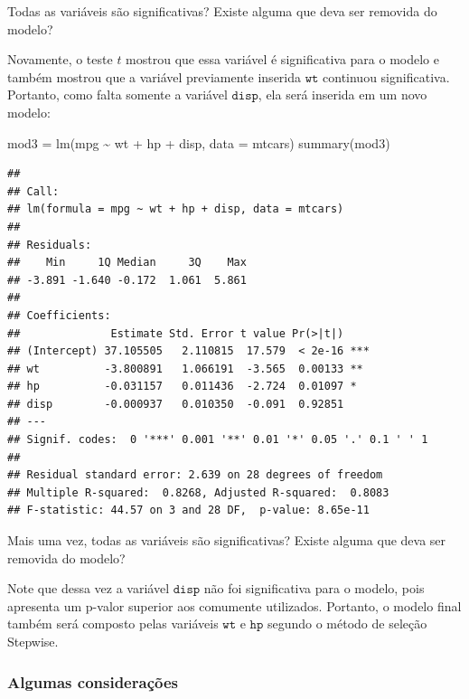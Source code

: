 \documentclass[
]{book}
\newenvironment{Shaded}{\begin{snugshade}}{\end{snugshade}}
\newcommand{\AttributeTok}[1]{\textcolor[rgb]{0.77,0.63,0.00}{#1}}
\newcommand{\FunctionTok}[1]{\textcolor[rgb]{0.00,0.00,0.00}{#1}}
\newcommand{\NormalTok}[1]{#1}
\newcommand{\OtherTok}[1]{\textcolor[rgb]{0.56,0.35,0.01}{#1}}
\newcommand{\SpecialCharTok}[1]{\textcolor[rgb]{0.00,0.00,0.00}{#1}}
\begin{document}
Todas as variáveis são significativas? Existe alguma que deva ser removida do modelo?

Novamente, o teste \(t\) mostrou que essa variável é significativa para o modelo e também mostrou que a variável previamente inserida \(\texttt{wt}\) continuou significativa. Portanto, como falta somente a variável \(\texttt{disp}\), ela será inserida em um novo modelo:

\begin{Shaded}
\begin{Highlighting}[]
\NormalTok{mod3 }\OtherTok{=} \FunctionTok{lm}\NormalTok{(mpg }\SpecialCharTok{\textasciitilde{}}\NormalTok{ wt }\SpecialCharTok{+}\NormalTok{ hp }\SpecialCharTok{+}\NormalTok{ disp, }\AttributeTok{data =}\NormalTok{ mtcars)}
\FunctionTok{summary}\NormalTok{(mod3)}
\end{Highlighting}
\end{Shaded}

\begin{verbatim}
## 
## Call:
## lm(formula = mpg ~ wt + hp + disp, data = mtcars)
## 
## Residuals:
##    Min     1Q Median     3Q    Max 
## -3.891 -1.640 -0.172  1.061  5.861 
## 
## Coefficients:
##              Estimate Std. Error t value Pr(>|t|)    
## (Intercept) 37.105505   2.110815  17.579  < 2e-16 ***
## wt          -3.800891   1.066191  -3.565  0.00133 ** 
## hp          -0.031157   0.011436  -2.724  0.01097 *  
## disp        -0.000937   0.010350  -0.091  0.92851    
## ---
## Signif. codes:  0 '***' 0.001 '**' 0.01 '*' 0.05 '.' 0.1 ' ' 1
## 
## Residual standard error: 2.639 on 28 degrees of freedom
## Multiple R-squared:  0.8268, Adjusted R-squared:  0.8083 
## F-statistic: 44.57 on 3 and 28 DF,  p-value: 8.65e-11
\end{verbatim}

Mais uma vez, todas as variáveis são significativas? Existe alguma que deva ser removida do modelo?

Note que dessa vez a variável \(\texttt{disp}\) não foi significativa para o modelo, pois apresenta um p-valor superior aos comumente utilizados. Portanto, o modelo final também será composto pelas variáveis \(\texttt{wt}\) e \(\texttt{hp}\) segundo o método de seleção Stepwise.

\hypertarget{algumas-considerauxe7uxf5es}{%
\subsubsection{Algumas considerações}\label{algumas-considerauxe7uxf5es}}
\end{document}
